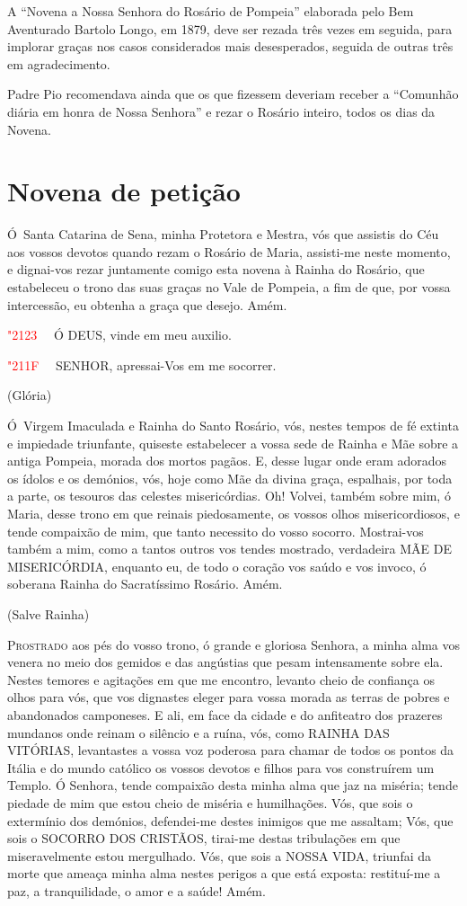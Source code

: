 \documentclass[10pt,twoside,a5paper]{article}
\newcommand{\versic}[1]{
	\textcolor{red}{\char"2123\ }#1
}
\newcommand{\response}[1]{
	\textcolor{red}{\char"211F\ }#1
}
\begin{document}
	A ``Novena a Nossa Senhora do Rosário de Pompeia'' elaborada pelo Bem Aventurado Bartolo Longo, em 1879, deve ser rezada três vezes em seguida, para implorar graças nos casos considerados mais desesperados, seguida de outras três em agradecimento.
	
	Padre Pio recomendava ainda que os que fizessem deveriam receber a ``Comunhão diária em honra de Nossa Senhora'' e rezar o Rosário inteiro, todos os dias da Novena.
	
	\section*{Novena de petição}
	
	\lettrine{Ó}\ Santa Catarina de Sena, minha Protetora e Mestra, vós que assistis do Céu aos vossos devotos quando rezam o Rosário de Maria, assisti-me neste momento, e dignai-vos rezar juntamente comigo esta novena à Rainha do Rosário, que estabeleceu o trono das suas graças no Vale de Pompeia, a fim de que, por vossa intercessão, eu obtenha a graça que desejo. Amém.
	
	\versic\ Ó DEUS, vinde em meu auxilio.
	
	\response\ SENHOR, apressai-Vos em me socorrer.
	
	(Glória)
	
	\lettrine{Ó}\ Virgem Imaculada e Rainha do Santo Rosário, vós, nestes tempos de fé extinta e impiedade triunfante, quiseste estabelecer a vossa sede de Rainha e Mãe sobre a antiga Pompeia, morada dos mortos pagãos. E, desse lugar onde eram adorados os ídolos e os demónios, vós, hoje como Mãe da divina graça, espalhais, por toda a parte, os tesouros das celestes misericórdias. Oh! Volvei, também sobre mim, ó Maria, desse trono em que reinais piedosamente, os vossos olhos misericordiosos, e tende compaixão de mim, que tanto necessito do vosso socorro. Mostrai-vos também a mim, como a tantos outros vos tendes mostrado, verdadeira MÃE DE MISERICÓRDIA, enquanto eu, de todo o coração vos saúdo e vos invoco, ó soberana Rainha do Sacratíssimo Rosário. Amém.
	
	(Salve Rainha)
	
	\lettrine{P}{rostrado} aos pés do vosso trono, ó grande e gloriosa Senhora, a minha alma vos venera no meio dos gemidos e das angústias que pesam intensamente sobre ela. Nestes temores e agitações em que me encontro, levanto cheio de confiança os olhos para vós, que vos dignastes eleger para vossa morada as terras de pobres e abandonados camponeses. E ali, em face da cidade e do anfiteatro dos prazeres mundanos onde reinam o silêncio e a ruína, vós, como RAINHA DAS VITÓRIAS, levantastes a vossa voz poderosa para chamar de todos os pontos da Itália e do mundo católico os vossos devotos e filhos para vos construírem um Templo. Ó Senhora, tende compaixão desta minha alma que jaz na miséria; tende piedade de mim que estou cheio de miséria e humilhações. Vós, que sois o extermínio dos demónios, defendei-me destes inimigos que me assaltam; Vós, que sois o SOCORRO DOS CRISTÃOS, tirai-me destas tribulações em que miseravelmente estou mergulhado. Vós, que sois a NOSSA VIDA, triunfai da morte que ameaça minha alma nestes perigos a que está exposta: restituí-me a paz, a tranquilidade, o amor e a saúde! Amém.
	
\end{document}
